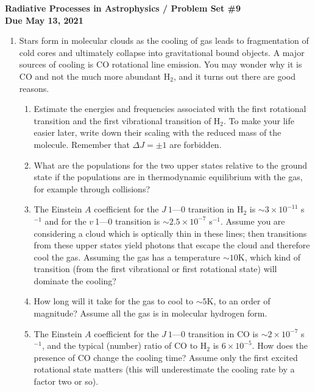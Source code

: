 \documentclass[11pt, preprint]{article}
\begin{document}
\begin{center}
  {\bf Radiative Processes in Astrophysics / Problem Set \#9 \\
    Due May 13, 2021}
\end{center}

\begin{enumerate}
\item Stars form in molecular clouds as the cooling of gas leads to
  fragmentation of cold cores and ultimately collapse into
  gravitational bound objects. A major sources of cooling is CO
  rotational line emission. You may wonder why it is CO and not the
  much more abundant H$_2$, and it turns out there are good reasons.

  \begin{enumerate}
    \item Estimate the energies and frequencies associated with the
      first rotational transition and the first vibrational transition
      of H$_2$. To make your life easier later, write down their
      scaling with the reduced mass of the molecule. Remember that
      $\Delta J=\pm 1$ are forbidden.
   \item What are the populations for the two upper states relative to
     the ground state if the populations are in thermodynamic
     equilibrium with the gas, for example through collisions?
   \item The Einstein $A$ coefficient for the $J~1$---$0$ transition
     in H$_2$ is $\sim 3\times 10^{-11}$ s$^{-1}$ and for the
     $v~$1---0 transition is $\sim 2.5\times 10^{-7}$ s$^{-1}$. Assume
     you are considering a cloud which is optically thin in these
     lines; then transitions from these upper states yield photons
     that escape the cloud and therefore cool the gas. Assuming the
     gas has a temperature $\sim 10$K, which kind of transition (from
     the first vibrational or first rotational state) will dominate
     the cooling?
   \item How long will it take for the gas to cool to $\sim 5$K, to an
     order of magnitude? Assume all the gas is in molecular hydrogen
     form.
   \item The Einstein $A$ coefficient for the $J~1$---$0$ transition in
     CO is $\sim 2\times 10^{-7}$ s$^{-1}$, and the typical (number)
     ratio of CO to H$_2$ is $6\times 10^{-5}$. How does the presence
     of CO change the cooling time? Assume only the first excited
     rotational state matters (this will underestimate the cooling
     rate by a factor two or so). 
  \end{enumerate}


\end{enumerate}
\end{document}
